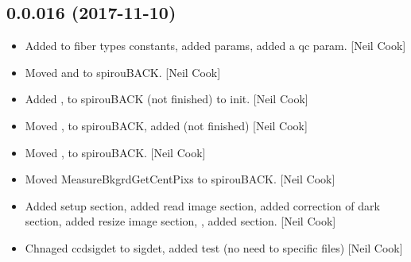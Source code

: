 \documentclass[a4paper,10pt,english]{report}
\begin{document}
\subsection{0.0.016 (2017-11-10)}
\label{\detokenize{misc/changelog:id535}}\begin{itemize}
\item {} 
Added  to fiber types constants, added  params, added a
qc param. {[}Neil Cook{]}

\item {} 
Moved  and
 to spirouBACK. {[}Neil Cook{]}

\item {} 
Added , 
to spirouBACK  (not finished) to init.
{[}Neil Cook{]}

\item {} 
Moved , 
to spirouBACK, added  (not finished) {[}Neil
Cook{]}

\item {} 
Moved , 
to spirouBACK. {[}Neil Cook{]}

\item {} 
Moved MeasureBkgrdGetCentPixs to spirouBACK. {[}Neil Cook{]}

\item {} 
Added setup section, added read image section, added correction of
dark section, added resize image section, , added  section.
{[}Neil Cook{]}

\item {} 
Chnaged ccdsigdet to sigdet, added test (no need to specific files)
{[}Neil Cook{]}

\end{itemize}
\end{document}
